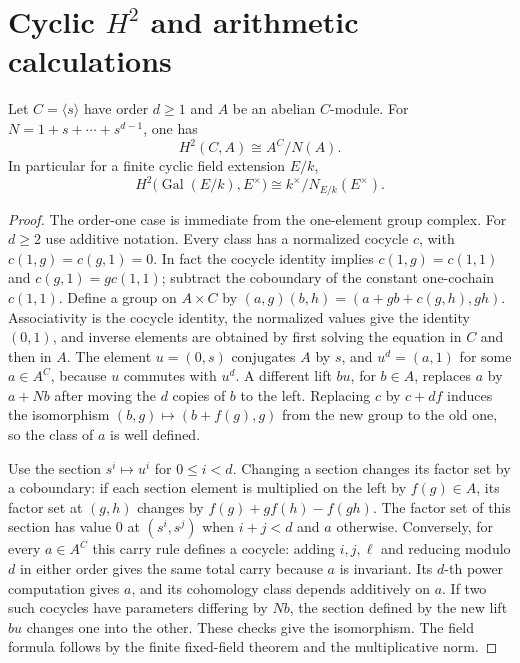 \section{Cyclic \texorpdfstring{\(H^2\)}{H2} and arithmetic calculations}

\begin{proposition}
\label{res:GH11}
Let \(C=\langle s\rangle\) have order \(d\geq1\) and \(A\) be an
abelian \(C\)-module. For \(N=1+s+\cdots+s^{d-1}\), one has
\[
 H^2(C,A)\cong A^C/N(A).
\]
In particular for a finite cyclic field extension \(E/k\),
\[
 H^2\bigl(\operatorname{Gal}(E/k),E^\times\bigr)
     \cong k^\times/N_{E/k}(E^\times).
\]
\end{proposition}
\begin{proof}
The order-one case is immediate from the one-element group complex.
For \(d\geq2\) use additive notation. Every class has a normalized
cocycle \(c\), with \(c(1,g)=c(g,1)=0\). In fact the cocycle identity
implies \(c(1,g)=c(1,1)\) and \(c(g,1)=g c(1,1)\); subtract the
coboundary of the constant one-cochain \(c(1,1)\).
Define a group on \(A\times C\) by
\((a,g)(b,h)=(a+g b+c(g,h),gh)\).
Associativity is the cocycle identity, the normalized values give
the identity \((0,1)\), and inverse elements are obtained by first
solving the equation in \(C\) and then in \(A\).
The element \(u=(0,s)\) conjugates \(A\) by \(s\), and
\(u^d=(a,1)\) for some \(a\in A^C\), because \(u\) commutes with
\(u^d\). A different lift \(b u\), for \(b\in A\), replaces
\(a\) by \(a+N b\) after moving the \(d\) copies of \(b\) to the
left. Replacing \(c\) by \(c+df\) induces the isomorphism
\((b,g)\mapsto (b+f(g),g)\) from the new group to the old one, so the
class of \(a\) is well defined.

Use the section \(s^i\mapsto u^i\) for \(0\leq i<d\).
Changing a section changes its factor set by a coboundary:
if each section element is multiplied on the left by \(f(g)\in A\),
its factor set at \((g,h)\) changes by
\(f(g)+g f(h)-f(gh)\). The factor set of this section has value \(0\)
at \((s^i,s^j)\) when \(i+j<d\) and \(a\) otherwise.
Conversely, for every \(a\in A^C\) this carry rule defines a
cocycle: adding \(i,j,\ell\) and reducing modulo \(d\) in either
order gives the same total carry because \(a\) is invariant.
Its \(d\)-th power computation gives \(a\), and its cohomology
class depends additively on \(a\). If two such cocycles have
parameters differing by \(N b\), the section defined by the
new lift \(b u\) changes one into the other. These checks give the
isomorphism. The field formula follows by the finite fixed-field
theorem and the multiplicative norm.
\end{proof}

